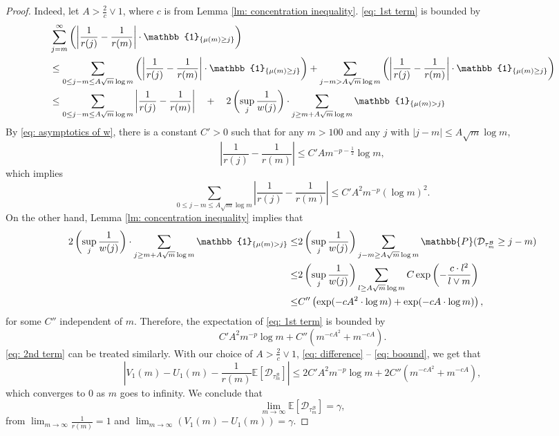 \documentclass[EJP]{ejpecp} %
\newcommand{\abs}[1]{\left\vert #1 \right\vert}
\begin{document}
\begin{proof}
	Indeed, let $A> \frac{2}{c} \vee 1$, where $c$ is from Lemma \ref{lm: concentration inequality}. \eqref{eq: 1st term} is bounded by
	\begin{align*}
		& \sum_{j=m}^{\infty} \left(\abs{\frac{1}{r(j)} -\frac{1}{r(m)} } \cdot \mathbb{1}_{\left\{\mu(m)\geq j \right\}}\right)\\
		& \leq  \sum_{0\leq j-m \leq A \sqrt{m}\log m } \left(\abs{\frac{1}{r(j)} -\frac{1}{r(m)} } \cdot \mathbb{1}_{\left\{\mu(m)\geq j \right\}}\right)
		+  \sum_{j-m > A\sqrt{m}\log m } \left(\abs{\frac{1}{r(j)} -\frac{1}{r(m)} } \cdot \mathbb{1}_{\left\{\mu(m)\geq j \right\}}\right)
		\notag
		\\
		&\leq  \sum_{0\leq j-m \leq A\sqrt{m}\log m } \abs{\frac{1}{r(j)} -\frac{1}{r(m)} }
		\quad +\quad 2\left(\sup_j \frac{1}{w(j)}\right) \cdot \sum_{j\geq m + A\sqrt{m}\log m } \mathbb{1}_{\left\{ \mu(m) > j \right\}}
		\label{eq: low large difference}
	\end{align*}
	By \eqref{eq: asymptotics of w}, there is a constant $C'>0$ such that for any $m>100 $ and any $j$ with $\abs{j-m}\leq A \sqrt m \log m $, 
	$$ \abs{\frac{1}{r(j)} -\frac{1}{r(m)} } \leq C' A m^{-p-\frac{1}{2}} \log m, $$
	which implies
	\[
	\sum_{0\leq j-m \leq A\sqrt{m}\log m } \abs{\frac{1}{r(j)} -\frac{1}{r(m)} } \le 
	C' A^2 m^{-p} (\log m)^2.
	\] On the other hand, Lemma \ref{lm: concentration inequality} implies that
	\begin{align*}
		2\left(\sup_j \frac{1}{w(j)}\right) \cdot \sum_{j\geq m + A\sqrt{m}\log m } \mathbb{1}_{\left\{ \mu(m) > j \right\}}
		\le & 2\left(\sup_j \frac{1}{w(j)}\right) \sum_{j-m \geq A \sqrt m \log m  } \mathbb{P}( \mathcal{D}_{\tau^{\mathcal{B}}_m} \geq j-m )  
		\notag 
		\\
		\leq& 2\left(\sup_j \frac{1}{w(j)}\right) \sum_{l \geq A \sqrt m \log m } C \exp\left( - \frac{c  \cdot l^2}{l \vee m}   \right)
		\notag\\
		\leq& C'' \left( \exp (- cA^2 \cdot \log m ) + \exp(-cA \cdot \log m) \right), 
	\end{align*} for some $C''$ independent of $m$. Therefore, the expectation of \eqref{eq: 1st term} is bounded by
	\begin{equation}\label{eq: boound}
		C' A^2 m^{-p} \log m + C''  \left( m ^{-cA^2} +  m^{-cA} \right). 
	\end{equation}
	\eqref{eq: 2nd term} can be treated similarly. With our choice of $A >\frac{2}{c} \vee 1$,
	\eqref{eq: difference} -- 
	\eqref{eq: boound}, we get that
	$$ \abs{ V_1(m)- U_1(m) -\frac{1}{r(m)}\mathbb{E}\left[ \mathcal{D}_{\tau^{\mathcal{B}}_m} \right] }
	\leq 2C' A^2 m^{-p} \log m + 2C''  \left( m ^{-cA^2} +  m^{-cA} \right), 
	$$ 
	which converges to $0$ as $m$ goes to infinity. We conclude that 
	$$
	\lim_{m\to\infty}\mathbb{E}\left[ \mathcal{D}_{\tau^{\mathcal{B}}_m} \right] = \gamma, 
	$$ 
	from $\lim_{m\to\infty}\frac{1}{r(m)} =1$ and $ \lim_{m\to \infty} \left(V_1(m)-U_1(m) \right) = \gamma$.
\end{proof}
\end{document}
